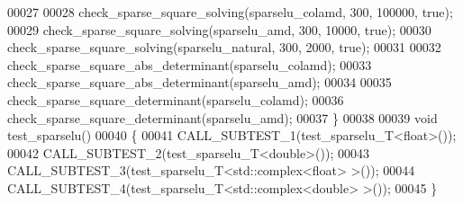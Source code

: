 \begin{DoxyCode}
00027   
00028   check\_sparse\_square\_solving(sparselu\_colamd,  300, 100000, \textcolor{keyword}{true}); 
00029   check\_sparse\_square\_solving(sparselu\_amd,     300,  10000, \textcolor{keyword}{true});
00030   check\_sparse\_square\_solving(sparselu\_natural, 300,   2000, \textcolor{keyword}{true});
00031   
00032   check\_sparse\_square\_abs\_determinant(sparselu\_colamd);
00033   check\_sparse\_square\_abs\_determinant(sparselu\_amd);
00034   
00035   check\_sparse\_square\_determinant(sparselu\_colamd);
00036   check\_sparse\_square\_determinant(sparselu\_amd);
00037 \}
00038 
00039 \textcolor{keywordtype}{void} test\_sparselu()
00040 \{
00041   CALL\_SUBTEST\_1(test\_sparselu\_T<float>()); 
00042   CALL\_SUBTEST\_2(test\_sparselu\_T<double>());
00043   CALL\_SUBTEST\_3(test\_sparselu\_T<std::complex<float> >()); 
00044   CALL\_SUBTEST\_4(test\_sparselu\_T<std::complex<double> >());
00045 \}
\end{DoxyCode}

